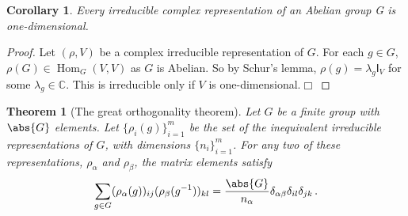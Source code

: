 \documentclass{article}
\theoremstyle{plain}\theoremheaderfont{\normalfont\itshape}\theorembodyfont{\rmfamily}\theoremseparator{.}\newtheorem*{rem}{Remark}\newtheorem*{ex}{Example}\newtheorem*{proof}{Proof}\newtheorem*{altp}{Alternative proof}
\theoremstyle{plain}\theoremheaderfont{\normalfont\bfseries}\theorembodyfont{\rmfamily}\theoremseparator{.}\newtheorem{thm}{Theorem}[section]\newtheorem{lem}[thm]{Lemma}\newtheorem{prop}[thm]{Proposition}\newtheorem*{cor}{Corollary}\newtheorem{defn}[thm]{Definition}\newtheorem{clm}[thm]{Claim}\newtheorem{clminproof}{Claim}
\theoremstyle{break}\theoremheaderfont{\normalfont\itshape}\theorembodyfont{\rmfamily}\theoremseparator{.\medskip}\newtheorem*{proofskip}{Proof}\newtheorem*{exs}{Examples}\newtheorem*{rems}{Remarks}
\theoremstyle{break}\theoremheaderfont{\normalfont\bfseries}\theorembodyfont{\rmfamily}\theoremseparator{.\medskip}\newtheorem{lemskip}[thm]{Lemma}\newtheorem{defnskip}[thm]{Definition}\newtheorem{propskip}[thm]{Proposition}\newtheorem{thmskip}[thm]{Theorem}
\numberwithin{equation}{section}
\newcommand{\qed}{\hfill\ensuremath{\Box}}
\DeclareMathOperator{\Hom}{Hom}
\begin{document}
	\begin{cor}
		Every irreducible complex representation of an Abelian group G is one-dimensional.
	\end{cor}
	\begin{proof}
		Let \((\rho,V)\) be a complex irreducible representation of \(G\). For each \(g\in G\), \(\rho(G)\in\Hom_G(V,V)\) as \(G\) is Abelian. So by Schur's lemma, \(\rho(g) = \lambda_g \mathsf{I}_V\) for some \(\lambda_g\in\mathbb{C}\). This is irreducible only if \(V\) is one-dimensional.\qed
	\end{proof}
	\begin{thm}[The great orthogonality theorem]\label{orthothm}
		Let \(G\) be a finite group with \(\abs{G}\) elements. Let \(\{\rho_i(g)\}_{i=1}^{m}\) be the set of the inequivalent irreducible representations of \(G\), with dimensions \(\{n_i\}_{i=1}^{m}\). For any two of these representations, \(\rho_\alpha\) and \(\rho_\beta\), the matrix elements satisfy
		\[\sum_{g\in G}(\rho_\alpha(g))_{ij}(\rho_\beta(g^{-1}))_{kl}=\frac{\abs{G}}{n_\alpha}\delta_{\alpha\beta}\delta_{il}\delta_{jk}\,.\]
	\end{thm}
\end{document}
